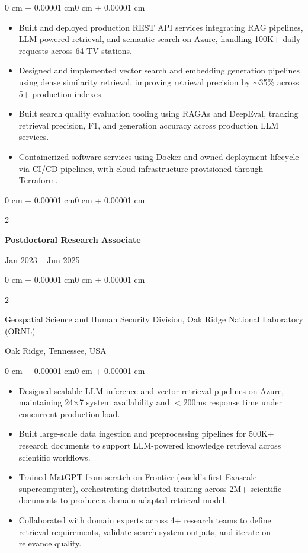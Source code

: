 \documentclass[10pt, letterpaper]{article}
\newenvironment{highlights}{
    \begin{itemize}[topsep=0.10 cm, parsep=0.10 cm, partopsep=0pt, itemsep=0pt, leftmargin=0 cm + 10pt]
}{\end{itemize}}
\newenvironment{onecolentry}{
    \begin{adjustwidth}{0 cm + 0.00001 cm}{0 cm + 0.00001 cm}
}{\end{adjustwidth}}
\newenvironment{twocolentry}[2][]{
    \onecolentry
    \def\secondColumn{#2}
    \setcolumnwidth{\fill, 4.5 cm}
    \begin{paracol}{2}
}{
    \switchcolumn \raggedleft \secondColumn
    \end{paracol}
    \endonecolentry
}
\begin{document}
    \begin{onecolentry}
        \begin{highlights}
            \item Built and deployed production REST API services integrating RAG pipelines, LLM-powered retrieval, and semantic search on Azure, handling 100K+ daily requests across 64 TV stations.
            \item Designed and implemented vector search and embedding generation pipelines using dense similarity retrieval, improving retrieval precision by $\sim$35\% across 5+ production indexes.
            \item Built search quality evaluation tooling using RAGAs and DeepEval, tracking retrieval precision, F1, and generation accuracy across production LLM services.
            \item Containerized software services using Docker and owned deployment lifecycle via CI/CD pipelines, with cloud infrastructure provisioned through Terraform.
        \end{highlights}
    \end{onecolentry}

\vspace{1mm}

    \begin{twocolentry}{Jan 2023 -- Jun 2025}
        \textbf{Postdoctoral Research Associate}
    \end{twocolentry}
    \begin{twocolentry}{Oak Ridge, Tennessee, USA}
        Geospatial Science and Human Security Division, Oak Ridge National Laboratory (ORNL)
    \end{twocolentry}
    \vspace{0.10 cm}
    \begin{onecolentry}
        \begin{highlights}
            \item Designed scalable LLM inference and vector retrieval pipelines on Azure, maintaining 24×7 system availability and $<$200ms response time under concurrent production load.
            \item Built large-scale data ingestion and preprocessing pipelines for 500K+ research documents to support LLM-powered knowledge retrieval across scientific workflows.
            \item Trained MatGPT from scratch on Frontier (world's first Exascale supercomputer), orchestrating distributed training across 2M+ scientific documents to produce a domain-adapted retrieval model.
            \item Collaborated with domain experts across 4+ research teams to define retrieval requirements, validate search system outputs, and iterate on relevance quality.
        \end{highlights}
    \end{onecolentry}
\end{document}
